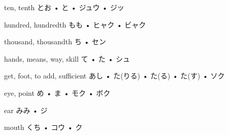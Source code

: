 



\setcounter{cardnum}{17}

		{ten, tenth}
		{とお • と • ジュウ • ジッ}
		{}{}
		{}{}
		{}{}
		{}{}
		{}{}

		{hundred, hundredth}
		{もも • ヒャク • ビャク}
		{}{}
		{}{}
		{}{}
		{}{}
		{}{}

		{thousand, thousandth}
		{ち • セン}
		{}{}
		{}{}
		{}{}
		{}{}
		{}{}

		{hands, means, way, skill}
		{て • た • シュ}
		{}{}
		{}{}
		{}{}
		{}{}
		{}{}

		{get, foot, to add, sufficient}
		{あし • た(りる) • た(る) • た(す) • ソク}
		{}{}
		{}{}
		{}{}
		{}{}
		{}{}

		{eye, point}
		{め • ま • モク • ボク}
		{}{}
		{}{}
		{}{}
		{}{}
		{}{}

		{ear}
		{みみ • ジ}
		{}{}
		{}{}
		{}{}
		{}{}
		{}{}

		{mouth}
		{くち • コウ • ク}
		{}{}
		{}{}
		{}{}
		{}{}
		{}{}

